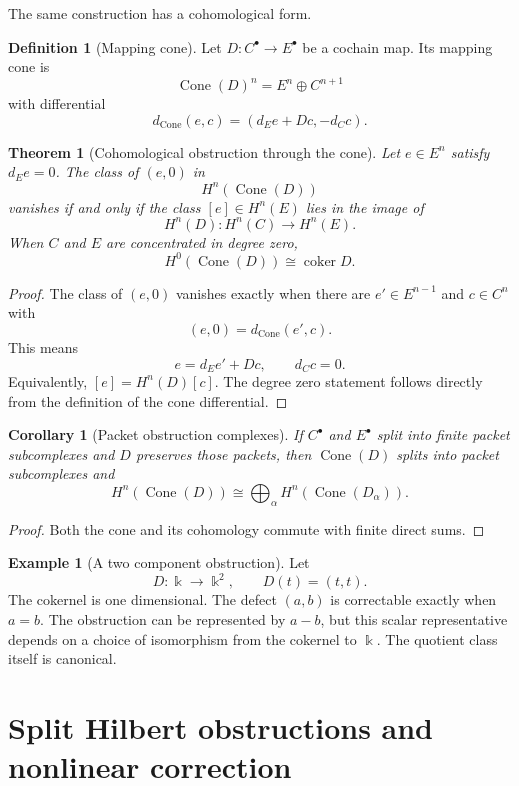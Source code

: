 \documentclass{aomart}
\newtheorem{theorem}{Theorem}[section]
\newtheorem{corollary}[corollary]{Corollary}
\theoremstyle{definition}
\newtheorem{definition}[definition]{Definition}
\newtheorem{example}[example]{Example}
\theoremstyle{remark}
\newcommand{\bbk}{\Bbbk}
\newcommand{\coker}{\operatorname{coker}}
\newcommand{\Cone}{\operatorname{Cone}}
\begin{document}
The same construction has a cohomological form.

\begin{definition}[Mapping cone]\label{def:mapping_cone}
Let $D:C^\bullet\to E^\bullet$ be a cochain map.  Its mapping cone is
\[
\Cone(D)^n=E^n\oplus C^{n+1}
\]
with differential
\[
d_{\Cone}(e,c)=(d_Ee+Dc,-d_Cc).
\]
\end{definition}

\begin{theorem}[Cohomological obstruction through the cone]\label{thm:cone_obstruction}
Let $e\in E^n$ satisfy $d_Ee=0$.  The class of $(e,0)$ in
\[
H^n(\Cone(D))
\]
vanishes if and only if the class $[e]\in H^n(E)$ lies in the image of
\[
H^n(D):H^n(C)\longrightarrow H^n(E).
\]
When $C$ and $E$ are concentrated in degree zero,
\[
H^0(\Cone(D))\cong\coker D.
\]
\end{theorem}

\begin{proof}
The class of $(e,0)$ vanishes exactly when there are $e'\in E^{n-1}$ and $c\in C^n$ with
\[
(e,0)=d_{\Cone}(e',c).
\]
This means
\[
e=d_Ee'+Dc,
\qquad
d_Cc=0.
\]
Equivalently, $[e]=H^n(D)[c]$.  The degree zero statement follows directly from the definition of the cone differential.
\end{proof}

\begin{corollary}[Packet obstruction complexes]\label{cor:packet_obstruction_complexes}
If $C^\bullet$ and $E^\bullet$ split into finite packet subcomplexes and $D$ preserves those packets, then $\Cone(D)$ splits into packet subcomplexes and
\[
H^n(\Cone(D))
\cong
\bigoplus_\alpha H^n(\Cone(D_\alpha)).
\]
\end{corollary}

\begin{proof}
Both the cone and its cohomology commute with finite direct sums.
\end{proof}

\begin{example}[A two component obstruction]\label{ex:two_component_obstruction}
Let
\[
D:\bbk\longrightarrow\bbk^2,
\qquad
D(t)=(t,t).
\]
The cokernel is one dimensional.  The defect $(a,b)$ is correctable exactly when $a=b$.  The obstruction can be represented by $a-b$, but this scalar representative depends on a choice of isomorphism from the cokernel to $\bbk$.  The quotient class itself is canonical.
\end{example}

\section{Split Hilbert obstructions and nonlinear correction}\label{sec:split_obstruction}
\end{document}
